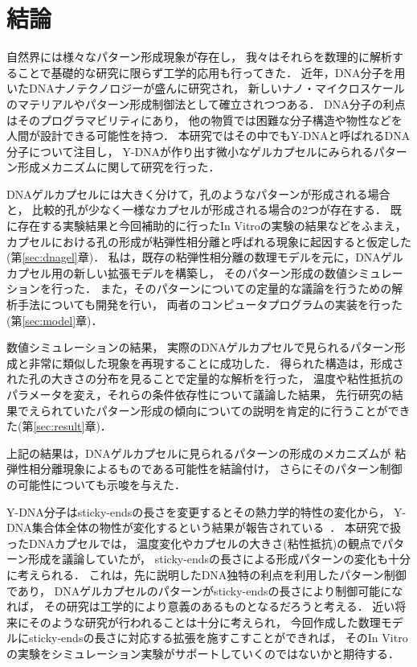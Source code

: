 \chapter{結論}

自然界には様々なパターン形成現象が存在し，
我々はそれらを数理的に解析することで基礎的な研究に限らず工学的応用も行ってきた．
近年，DNA分子を用いたDNAナノテクノロジーが盛んに研究され，
新しいナノ・マイクロスケールのマテリアルやパターン形成制御法として確立されつつある．
DNA分子の利点はそのプログラマビリティにあり，
他の物質では困難な分子構造や物性などを人間が設計できる可能性を持つ．
本研究ではその中でもY-DNAと呼ばれるDNA分子について注目し，
Y-DNAが作り出す微小なゲルカプセルにみられるパターン形成メカニズムに関して研究を行った．

DNAゲルカプセルには大きく分けて，孔のようなパターンが形成される場合と，
比較的孔が少なく一様なカプセルが形成される場合の2つが存在する．
既に存在する実験結果と今回補助的に行ったIn Vitroの実験の結果などをふまえ，
カプセルにおける孔の形成が粘弾性相分離と呼ばれる現象に起因すると仮定した(第\ref{sec:dnagel}章)．
私は，既存の粘弾性相分離の数理モデルを元に，DNAゲルカプセル用の新しい拡張モデルを構築し，
そのパターン形成の数値シミュレーションを行った．
また，そのパターンについての定量的な議論を行うための解析手法についても開発を行い，
両者のコンピュータプログラムの実装を行った(第\ref{sec:model}章)．

数値シミュレーションの結果，
実際のDNAゲルカプセルで見られるパターン形成と非常に類似した現象を再現することに成功した．
得られた構造は，形成された孔の大きさの分布を見ることで定量的な解析を行った，
温度や粘性抵抗のパラメータを変え，それらの条件依存性について議論した結果，
先行研究の結果でえられていたパターン形成の傾向についての説明を肯定的に行うことができた(第\ref{sec:result}章)．

上記の結果は，DNAゲルカプセルに見られるパターンの形成のメカニズムが
粘弾性相分離現象によるものである可能性を結論付け，
さらにそのパターン制御の可能性についても示唆を与えた．

Y-DNA分子はsticky-endsの長さを変更するとその熱力学的特性の変化から，
Y-DNA集合体全体の物性が変化するという結果が報告されている~\cite{sato2019sequence}．
本研究で扱ったDNAカプセルでは，
温度変化やカプセルの大きさ(粘性抵抗)の観点でパターン形成を議論していたが，
sticky-endsの長さによる形成パターンの変化も十分に考えられる．
これは，先に説明したDNA独特の利点を利用したパターン制御であり，
DNAゲルカプセルのパターンがsticky-endsの長さにより制御可能になれば，
その研究は工学的により意義のあるものとなるだろうと考える．
近い将来にそのような研究が行われることは十分に考えられ，
今回作成した数理モデルにsticky-endsの長さに対応する拡張を施すこすことができれば，
そのIn Vitroの実験をシミュレーション実験がサポートしていくのではないかと期待する．
